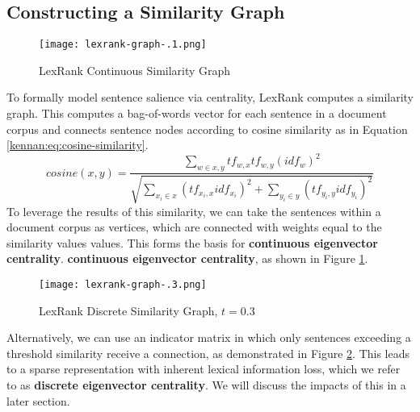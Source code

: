 \documentclass[../writeup.tex]{subfiles}
\begin{document}
\subsection{Constructing a Similarity Graph}\label{kennan:sec:lexrank-similarity-graph}
\begin{figure}[h]
  \centering
  \texttt{[image: lexrank-graph-.1.png]}
  \caption{LexRank Continuous Similarity Graph}
  \label{kennan:fig:lexrank-similarity-graph}
\end{figure}
To formally model sentence salience via centrality, LexRank computes a similarity graph.
This computes a bag-of-words vector
for each sentence in a document corpus and connects sentence nodes according to
cosine similarity as in Equation \ref{kennan:eq:cosine-similarity}.
\begin{equation}\label{kennan:eq:cosine-similarity}
    cosine(x, y) =
    \frac{\sum_{w \in x,y} tf_{w,x} tf_{w, y} (idf_w)^2}
    {\sqrt{\sum_{x_i \in x} (tf_{x_i,x} idf_{x_i})^2 + \sum_{y_i \in y} (tf_{y_i,y} idf_{y_i})^2}}
\end{equation}
To leverage the results of this similarity, we can take the sentences within a document corpus as vertices, which are
connected with weights equal to the similarity values values. This forms the basis for \textbf{continuous eigenvector centrality}.
\textbf{continuous eigenvector centrality}, as shown in Figure \ref{kennan:fig:lexrank-similarity-graph}.
\begin{figure}[h]
  \centering
  \texttt{[image: lexrank-graph-.3.png]}
  \caption{LexRank Discrete Similarity Graph, $t=0.3$}
  \label{kennan:fig:lexrank-discrete-similarity-graph}
\end{figure}
Alternatively, we can use an indicator matrix in which only sentences exceeding a
threshold similarity receive a connection, as demonstrated in Figure \ref{kennan:fig:lexrank-discrete-similarity-graph}.
This leads to a sparse representation with inherent lexical information loss, which we refer to as
\textbf{discrete eigenvector centrality}. We will discuss the impacts of this in a
later section.
\end{document}
